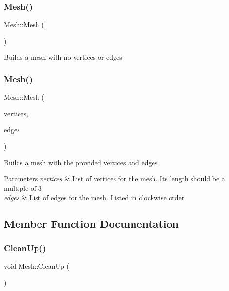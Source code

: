 \subsubsection{\texorpdfstring{Mesh()}{Mesh()}\hspace{0.1cm}{\footnotesize\ttfamily [1/2]}}
{\footnotesize\ttfamily Mesh\+::\+Mesh (\begin{DoxyParamCaption}{ }\end{DoxyParamCaption})}

Builds a mesh with no vertices or edges \mbox{\label{classMesh_acca57d57a35d834a9ba0fa0290a4d121}} 
\subsubsection{\texorpdfstring{Mesh()}{Mesh()}\hspace{0.1cm}{\footnotesize\ttfamily [2/2]}}
{\footnotesize\ttfamily Mesh\+::\+Mesh (\begin{DoxyParamCaption}\item[{std\+::vector$<$ G\+Lfloat $>$}]{vertices,  }\item[{std\+::vector$<$ std\+::pair$<$ G\+Luint, G\+Luint $>$$>$}]{edges }\end{DoxyParamCaption})}

Builds a mesh with the provided vertices and edges 
\begin{DoxyParams}{Parameters}
{\em vertices} & List of vertices for the mesh. It\textquotesingle{}s length should be a multiple of 3 \\
\hline
{\em edges} & List of edges for the mesh. Listed in clockwise order \\
\hline
\end{DoxyParams}


\subsection{Member Function Documentation}
\mbox{\label{classMesh_abe1f7ce31904fb28cef0c156b892af8e}} 
\subsubsection{\texorpdfstring{Clean\+Up()}{CleanUp()}}
{\footnotesize\ttfamily void Mesh\+::\+Clean\+Up (\begin{DoxyParamCaption}{ }\end{DoxyParamCaption})}


